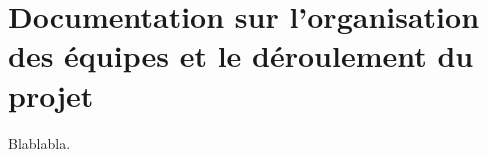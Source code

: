 \newpage

\chapter{Documentation sur l'organisation des équipes et le déroulement du projet}

Blablabla.
